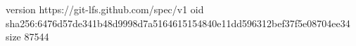 version https://git-lfs.github.com/spec/v1
oid sha256:6476d57de341b48d9998d7a5164615154840e11dd596312bef37f5e08704ee34
size 87544
